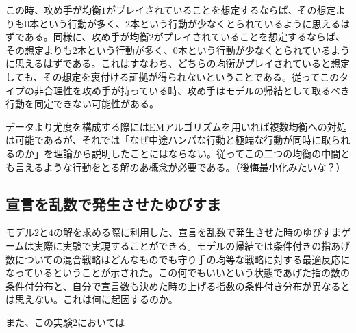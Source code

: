 \documentclass{jsarticle}
\begin{document}
この時、攻め手が均衡$1$がプレイされていることを想定するならば、その想定よりも$0$本という行動が多く、$2$本という行動が少なくとられているように思えるはずである。同様に、攻め手が均衡$2$がプレイされていることを想定するならば、その想定よりも$2$本という行動が多く、$0$本という行動が少なくとられているように思えるはずである。これはすなわち、どちらの均衡がプレイされていると想定しても、その想定を裏付ける証拠が得られないということである。従ってこのタイプの非合理性を攻め手が持っている時、攻め手はモデルの帰結として取るべき行動を同定できない可能性がある。

データより尤度を構成する際にはEMアルゴリズムを用いれば複数均衡への対処は可能であるが、それでは「なぜ中途ハンパな行動と極端な行動が同時に取られるのか」を理論から説明したことにはならない。従ってこの二つの均衡の中間とも言えるような行動をとる解のあ概念が必要である。（後悔最小化みたいな？）

\subsection{宣言を乱数で発生させたゆびすま}
モデル$2$と$4$の解を求める際に利用した、宣言を乱数で発生させた時のゆびすまゲームは実際に実験で実現することができる。モデルの帰結では条件付きの指あげ数についての混合戦略はどんなものでも守り手の均等な戦略に対する最適反応になっているということが示された。この何でもいいという状態であげた指の数の条件付分布と、自分で宣言数も決めた時の上げる指数の条件付き分布が異なるとは思えない。これは何に起因するのか。

また、この実験2においては
\end{document}
